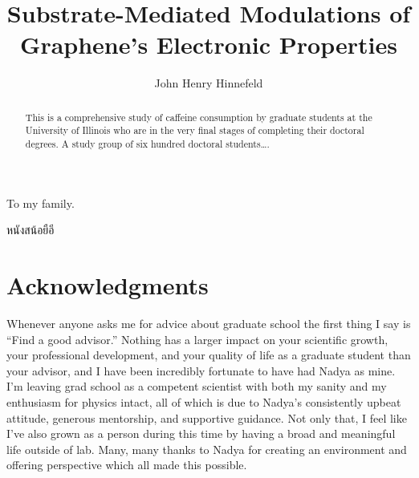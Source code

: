 \documentclass[edeposit,fullpage,draftthesis]{uiucthesis2009}
\begin{document}
\title{Substrate-Mediated Modulations of Graphene's Electronic Properties}
\author{John Henry Hinnefeld}
\phdthesis
{}
\maketitle

\frontmatter

\begin{abstract}
This is a comprehensive study of caffeine consumption by graduate
students at the University of Illinois who are in the very final
stages of completing their doctoral degrees. A study group of six
hundred doctoral students\ldots.
\end{abstract}

\begin{dedication}
To my family.

\foreignlanguage{thai}{\textthai{หนังสน้อยือี}}

\end{dedication}

\chapter*{Acknowledgments}

Whenever anyone asks me for advice about graduate school the first thing
I say is ``Find a good advisor.'' Nothing has a larger impact on your scientific growth, 
your professional development, and your quality
of life as a graduate student than your advisor, and I have been incredibly fortunate
to have had Nadya as mine. I'm leaving grad school as a competent scientist with both my sanity and my enthusiasm
for physics intact, all of which is due to Nadya's consistently upbeat attitude, generous mentorship,
and supportive guidance. 
Not only that, I feel like I've also grown as a person
during this time by having a broad and meaningful life outside of lab.
Many, many thanks to Nadya for creating an environment and offering perspective 
which all made this possible.
\end{document}
